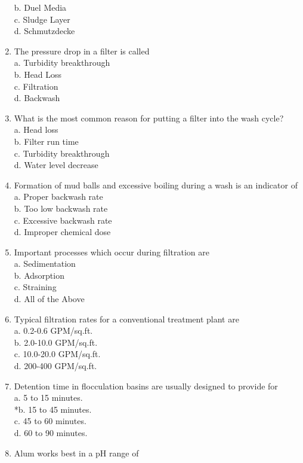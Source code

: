 \begin{enumerate}
b. Duel Media\\
c. Sludge Layer\\
d. Schmutzdecke\\
\item The pressure drop in a filter is called\\
a. Turbidity breakthrough\\
b. Head Loss\\
c. Filtration\\
d. Backwash\\
\item What is the most common reason for putting a filter into the wash cycle?\\
a. Head loss\\
b. Filter run time\\
c. Turbidity breakthrough\\
d. Water level decrease\\
\item Formation of mud balls and excessive boiling during a wash is an indicator of\\
a. Proper backwash rate\\
b. Too low backwash rate\\
c. Excessive backwash rate\\
d. Improper chemical dose\\
\item Important processes which occur during filtration are\\
a. Sedimentation\\
b. Adsorption\\
c. Straining\\
d. All of the Above\\
\item Typical filtration rates for a conventional treatment plant are\\
a. 0.2-0.6 GPM/sq.ft.\\
b. 2.0-10.0 GPM/sq.ft.\\
c. 10.0-20.0 GPM/sq.ft.\\
d. 200-400 GPM/sq.ft.
\item Detention time in flocculation basins are usually designed to provide for\\
a. 5 to 15 minutes.\\
*b. 15 to 45 minutes.\\
c. 45 to 60 minutes.\\
d. 60 to 90 minutes.\\
\item Alum works best in a pH range of\\

\end{enumerate}
